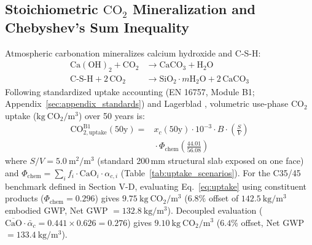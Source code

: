 \documentclass[journal]{IEEEtran}
\begin{document}
\subsection{\texorpdfstring{Stoichiometric $\mathrm{CO}_2$ Mineralization and Chebyshev's Sum Inequality}{Stoichiometric CO2 Mineralization and Chebyshev's Sum Inequality}}
Atmospheric carbonation mineralizes calcium hydroxide and C-S-H:
\begin{align}
\mathrm{Ca(OH)}_2 + \mathrm{CO}_2 &\to \mathrm{CaCO}_3 + \mathrm{H}_2\mathrm{O} \label{eq:rxn1} \\
\mathrm{C}\text{-}\mathrm{S}\text{-}\mathrm{H} + 2\,\mathrm{CO}_2 &\to \mathrm{SiO}_2 \cdot m\mathrm{H}_2\mathrm{O} + 2\,\mathrm{CaCO}_3 \label{eq:rxn2}
\end{align}
Following standardized uptake accounting (EN 16757, Module B1; Appendix~\ref{sec:appendix_standards}) and Lagerblad \cite{lagerblad2005}, volumetric use-phase $\mathrm{CO}_2$ uptake ($\mathrm{kg\ CO_2 / m^3}$) over 50 years is:
\begin{align}
\mathrm{CO}_{2,\mathrm{uptake}}^{\mathrm{B1}}(50\mathrm{y}) ={}& x_c(50\mathrm{y}) \cdot 10^{-3} \cdot B \cdot \left(\frac{S}{V}\right) \nonumber \\
&{}\cdot \Phi_{\mathrm{chem}} \left(\frac{44.01}{56.08}\right)
\label{eq:uptake}
\end{align}
where $S/V = 5.0\ \mathrm{m^2/m^3}$ (standard 200\,mm structural slab exposed on one face) and $\Phi_{\mathrm{chem}} = \sum_i f_i \cdot \mathrm{CaO}_i \cdot \alpha_{c,i}$ (Table~\ref{tab:uptake_scenarios}). For the C35/45 benchmark defined in Section V-D, evaluating Eq.~\ref{eq:uptake} using constituent products ($\Phi_{\mathrm{chem}} = 0.296$) gives $9.75\ \mathrm{kg\ CO_2/m^3}$ ($6.8\%$ offset of $142.5\ \mathrm{kg/m^3}$ embodied GWP, Net GWP $= 132.8\ \mathrm{kg/m^3}$). Decoupled evaluation ($\overline{\mathrm{CaO}} \cdot \bar{\alpha}_c = 0.441 \times 0.626 = 0.276$) gives $9.10\ \mathrm{kg\ CO_2/m^3}$ ($6.4\%$ offset, Net GWP $= 133.4\ \mathrm{kg/m^3}$).
\end{document}

